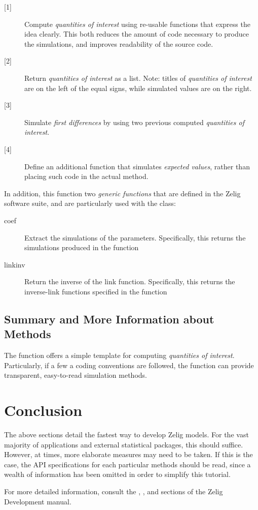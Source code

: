 \begin{description}

	\item[{[1]}] Compute \emph{quantities of interest} using re-usable functions that express the idea clearly. This both reduces the amount of code necessary to produce the simulations, and improves readability of the source code.
	
	\item[{[2]}] Return \emph{quantities of interest} as a list. Note: titles of
		\emph{quantities of interest} are on the left of the equal signs, while
		simulated values are on the right.
		
	\item[{[3]}] Simulate \emph{first differences} by using two previous computed \emph{quantities of interest}.
	  
	\item[{[4]}] Define an additional function that simulates \emph{expected values}, rather than placing such code in the actual  method.

\end{description}

\noindent In addition, this function two \emph{generic functions} that are
defined in the Zelig software suite, and are particularly used with the  class:

\begin{description}

	\item[coef] Extract the simulations of the parameters. Specifically, this returns the simulations produced in the  function
	
	\item[linkinv] Return the inverse of the link function. Specifically, this returns the inverse-link functions specified in the  function

\end{description}

\subsection{Summary and More Information about  Methods}

The  function offers a simple template for computing \emph{quantities of interest}. Particularly, if a few a coding conventions are followed, the  function can provide transparent, easy-to-read simulation methods.

\section{Conclusion}

The above sections detail the fastest way to develop Zelig models. For the vast majority of applications and external statistical packages, this should suffice. However, at times, more elaborate measures may need to be taken. If this is the case, the API specifications for each particular methods should be read, since a wealth of information has been omitted in order to simplify this tutorial.

For more detailed information, consult the , , and  sections of the Zelig Development manual.
